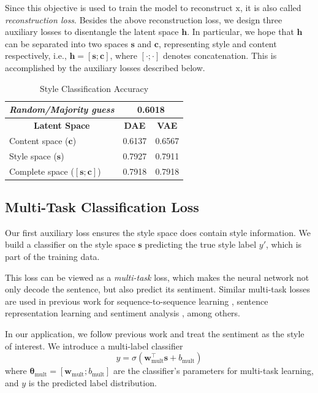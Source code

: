 \documentclass[11pt,a4paper]{article}
\newcommand{\rmx}{\mathrm x}
\newcommand{\tabh}[1]{\multicolumn{1}{c|}{\textbf{#1}}}
\newcommand{\tabc}[2]{\multicolumn{1}{|c|}{\multirow{#1}{*}{\textbf{#2}}}}
\begin{document}
Since this objective is used to train the model to reconstruct $\rmx$, it is also called \textit{reconstruction loss}. Besides the above reconstruction loss, we design three auxiliary losses to disentangle the latent space $\bm h$. In particular, we hope that $\bm h$ can be separated into two spaces $\bm s$ and $\bm c$, representing style and content respectively, i.e., $\bm h = [\bm s ; \bm c]$, where $[\cdot;\cdot]$ denotes concatenation. This is accomplished by the auxiliary losses described below.

\begin{table}[ht]
	\centering
	\begin{tabular}{| l | r | r |}
		\hline
		\textit{Random/Majority guess}   & \multicolumn{2}{c|}{0.6018}              \\ \hline \hline
		\hline
		\tabc{1}{Latent Space}           & \tabh{DAE}                  & \tabh{VAE} \\
		\hline \hline
		Content space  ($\bm c$)         & 0.6137                      & 0.6567     \\ \hline
		Style space ($\bm s$)            & 0.7927                      & 0.7911     \\ \hline
		Complete space ($[\bm s;\bm c]$) & 0.7918                      & 0.7918     \\
		\hline
	\end{tabular}
	\caption{Style Classification Accuracy}
	\label{tab:classification}
\end{table}

\subsection{Multi-Task Classification Loss} \label{ssec:multitask-classification-objective}

Our first auxiliary loss ensures the style space does contain style information. We build a classifier on the style space $\bm s$ predicting the true style label $y'$, which is part of the training data.

This loss can be viewed as a \textit{multi-task} loss, which makes the neural network not only decode the sentence, but also predict its sentiment. Similar multi-task losses are used in previous work for sequence-to-sequence learning \cite{luong2015multi}, sentence representation learning \cite{jernite2017discourse} and sentiment analysis \cite{balikas2017multitask}, among others.

In our application, we follow previous work \cite{hu2017toward,shen2017style,fu2017style} and treat the sentiment as the style of interest. We introduce a multi-label classifier
\begin{equation} \label{eqn:class-pred}
	y = \sigma(\bm w_\text{mult}^\top \bm s + b_\text{mult})
\end{equation}
where $\bm\theta_\text{mult}=[\bm w_\text{mult}; b_\text{mult}]$ are the classifier's parameters for multi-task learning, and $y$ is the predicted label distribution.
\end{document}
